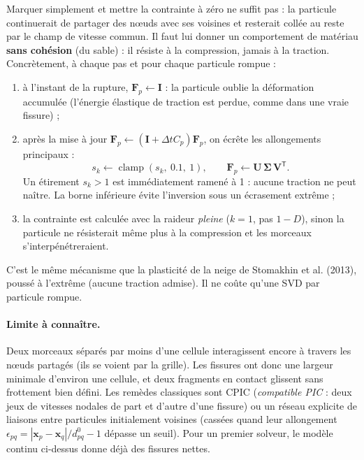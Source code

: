 \documentclass[11pt,a4paper]{article}
\newcommand{\code}[1]{\texttt{\detokenize{#1}}}
\newcommand{\bm}[1]{\boldsymbol{#1}}
\begin{document}
Marquer simplement \code{broken = 1} et mettre la contrainte à zéro ne suffit pas : la particule
continuerait de partager des n\oe uds avec ses voisines et resterait \og collée \fg{} au reste
par le champ de vitesse commun. Il faut lui donner un comportement de matériau \textbf{sans
cohésion} (du sable) : il résiste à la compression, jamais à la traction. Concrètement, à chaque
pas et pour chaque particule rompue :
\begin{enumerate}
  \item à l'instant de la rupture, $\mathbf F_p \leftarrow \mathbf I$ : la particule oublie la
        déformation accumulée (l'énergie élastique de traction est perdue, comme dans une vraie
        fissure) ;
  \item après la mise à jour $\mathbf F_p \leftarrow (\mathbf I + \Delta t C_p)\mathbf F_p$, on écrête
        les allongements principaux :
        \[
          s_k \leftarrow \operatorname{clamp}(s_k,\ 0.1,\ 1),\qquad \mathbf F_p \leftarrow \mathbf U\,\bm\Sigma\,\mathbf V^{\mathsf T}.
        \]
        Un étirement $s_k > 1$ est immédiatement ramené à 1 : aucune traction ne peut naître.
        La borne inférieure évite l'inversion sous un écrasement extrême ;
  \item la contrainte est calculée avec la raideur \emph{pleine} ($k = 1$, pas $1-D$), sinon la
        particule ne résisterait même plus à la compression et les morceaux s'interpénétreraient.
\end{enumerate}
C'est le même mécanisme que la plasticité de la neige de Stomakhin et al. (2013), poussé à
l'extrême (aucune traction admise). Il ne coûte qu'une SVD par particule rompue.

\paragraph{Limite à connaître.} Deux morceaux séparés par moins d'une cellule interagissent
encore à travers les n\oe uds partagés (ils \og se voient \fg{} par la grille). Les fissures ont
donc une largeur minimale d'environ une cellule, et deux fragments en contact glissent sans
frottement bien défini. Les remèdes classiques sont CPIC (\emph{compatible PIC} : deux jeux de
vitesses nodales de part et d'autre d'une fissure) ou un réseau explicite de liaisons entre
particules initialement voisines (cassées quand leur allongement
$\epsilon_{pq} = |\mathbf x_p - \mathbf x_q|/d^0_{pq} - 1$ dépasse un seuil). Pour un premier
solveur, le modèle continu ci-dessus donne déjà des fissures nettes.
\end{document}
